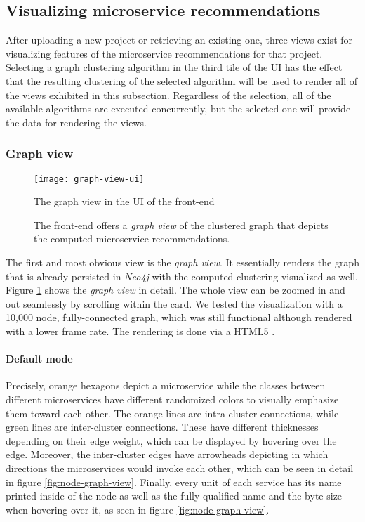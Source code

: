 \documentclass[12pt,a4paper]{report}
\begin{document}
\subsection{Visualizing microservice recommendations}

After uploading a new project or retrieving an existing one, three views exist
for visualizing features of the microservice recommendations for that project.
Selecting a graph clustering algorithm in the third tile of the UI has the
effect that the resulting clustering of the selected algorithm will be used to
render all of the views exhibited in this subsection. Regardless of the
selection, all of the available algorithms are executed concurrently, but the
selected one will provide the data for rendering the views.


\subsubsection{Graph view}
\begin{figure}[htbp]
\centering
\texttt{[image: graph-view-ui]}
\caption{The graph view in the UI of the front-end}
\caption*{\centering
  The front-end offers a \textit{graph view} of the clustered graph that depicts
  the computed microservice recommendations.
}
\label{fig:graph-view-ui}
\end{figure}

The first and most obvious view is the \textit{graph view}. It essentially
renders the graph that is already persisted in \textit{Neo4j} with the computed
clustering visualized as well. Figure \ref{fig:graph-view-ui} shows the \textit{
graph view} in detail. The whole view can be zoomed in and out seamlessly by
scrolling within the card. We tested the visualization with a 10,000 node,
fully-connected graph, which was still functional although rendered with a
lower frame rate. The rendering is done via a HTML5 .

\paragraph{Default mode}
Precisely, orange hexagons depict a microservice while
the classes between different microservices have different randomized colors to
visually emphasize them toward each other. The orange lines are intra-cluster
connections, while green lines are inter-cluster connections. These have
different thicknesses depending on their edge weight, which can be displayed by
hovering over the edge. Moreover, the inter-cluster edges have arrowheads
depicting in which directions the microservices would invoke each other, which
can be seen in detail in figure \ref{fig:node-graph-view}. Finally, every unit
of each service has its name printed inside of the node as well as the fully
qualified name and the byte size when hovering over it, as seen in figure
\ref{fig:node-graph-view}.
\end{document}
